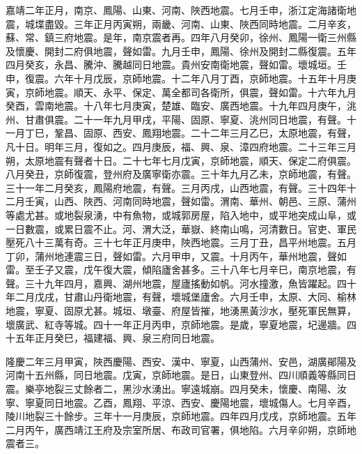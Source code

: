 \begin{pinyinscope}
嘉靖二年正月，南京、鳳陽、山東、河南、陜西地震。七月壬申，浙江定海諸衛地震，城堞盡毀。三年正月丙寅朔，兩畿、河南、山東、陜西同時地震。二月辛亥，蘇、常、鎮三府地震。是年，南京震者再。四年八月癸卯，徐州、鳳陽一衛三州縣及懷慶、開封二府俱地震，聲如雷。九月壬申，鳳陽、徐州及開封二縣復震。五年四月癸亥，永昌、騰沖、騰越同日地震。貴州安南衛地震，聲如雷。壞城垣。壬申，復震。六年十月戊辰，京師地震。十二年八月丁酉，京師地震。十五年十月庚寅，京師地震。順天、永平、保定、萬全都司各衛所，俱震，聲如雷。十六年九月癸酉，雲南地震。十八年七月庚寅，楚雄、臨安、廣西地震。十九年四月庚午，洮州、甘肅俱震。二十一年九月甲戌，平陽、固原、寧夏、洮州同日地震，有聲。十一月丁巳，鞏昌、固原、西安、鳳翔地震。二十二年三月乙巳，太原地震，有聲，凡十日。明年三月，復如之。四月庚辰，福、興、泉、漳四府地震。二十三年三月朔，太原地震有聲者十日。二十七年七月戊寅，京師地震，順天、保定二府俱震。八月癸丑，京師復震，登州府及廣寧衛亦震。三十年九月乙未，京師地震，有聲。三十一年二月癸亥，鳳陽府地震，有聲。三月丙戌，山西地震，有聲。三十四年十二月壬寅，山西、陜西、河南同時地震，聲如雷。渭南、華州、朝邑、三原、蒲州等處尤甚。或地裂泉湧，中有魚物，或城郭房屋，陷入地中，或平地突成山阜，或一日數震，或累日震不止。河、渭大泛，華嶽、終南山鳴，河清數日。官吏、軍民壓死八十三萬有奇。三十七年正月庚申，陜西地震。三月丁丑，昌平州地震。五月丁卯，蒲州地連震三日，聲如雷。六月甲申，又震。十月丙午，華州地震，聲如雷。至壬子又震，戊午復大震，傾陷廬舍甚多。三十八年七月辛巳，南京地震，有聲。三十九年四月，嘉興、湖州地震，屋廬搖動如帆。河水撞激，魚皆躍起。四十年二月戊戌，甘肅山丹衛地震，有聲，壞城堡廬舍。六月壬申，太原、大同、榆林地震，寧夏、固原尤甚。城垣、墩臺、府屋皆摧，地湧黑黃沙水，壓死軍民無算，壞廣武、紅寺等城。四十一年正月丙申，京師地震。是歲，寧夏地震，圮邊牆。四十五年正月癸巳，福建福、興、泉三府同日地震。

隆慶二年三月甲寅，陜西慶陽、西安、漢中、寧夏，山西蒲州、安邑，湖廣鄖陽及河南十五州縣，同日地震。戊寅，京師地震。是日，山東登州、四川順義等縣同日震。樂亭地裂三丈餘者二，黑沙水湧出。寧遠城崩。四月癸未，懷慶、南陽、汝寧、寧夏同日地震。乙酉，鳳翔、平涼、西安、慶陽地震，壞城傷人。七月辛酉，陵川地裂三十餘步。三年十一月庚辰，京師地震。四年四月戊戌，京師地震。五年二月丙午，廣西靖江王府及宗室所居、布政司官署，俱地陷。六月辛卯朔，京師地震者三。


\end{pinyinscope}
